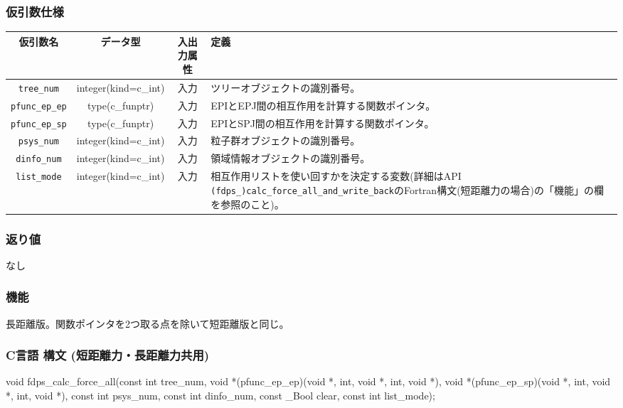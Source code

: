 \subsubsection*{仮引数仕様}
\begin{table}[h]
\begin{tabularx}{\linewidth}{cccX}
\toprule
\rowcolor{Snow2}
仮引数名 & データ型 & 入出力属性 & 定義 \\
\midrule
\verb|tree_num|    & integer(kind=c\_int)   & 入力     & ツリーオブジェクトの識別番号。\\
\verb|pfunc_ep_ep| & type(c\_funptr)        & 入力     & EPIとEPJ間の相互作用を計算する関数ポインタ。\\
\verb|pfunc_ep_sp| & type(c\_funptr)        & 入力     & EPIとSPJ間の相互作用を計算する関数ポインタ。\\
\verb|psys_num|    & integer(kind=c\_int)   & 入力     & 粒子群オブジェクトの識別番号。\\
\verb|dinfo_num|   & integer(kind=c\_int)   & 入力     & 領域情報オブジェクトの識別番号。\\
\verb|list_mode|   & integer(kind=c\_int)   & 入力     & 相互作用リストを使い回すかを決定する変数(詳細はAPI \texttt{(fdps\_)calc\_force\_all\_and\_write\_back}のFortran構文(短距離力の場合)の「機能」の欄を参照のこと)。\\
\bottomrule
\end{tabularx}
\end{table}

\subsubsection*{返り値}
なし

\subsubsection*{機能}
長距離版。関数ポインタを2つ取る点を除いて短距離版と同じ。
\clearpage

\subsubsection*{C言語 構文 (短距離力・長距離力共用)}
\begin{screen}
\begin{spverbatim}
void fdps_calc_force_all(const int tree_num,
                         void *(pfunc_ep_ep)(void *, int, void *, int, void *),
                         void *(pfunc_ep_sp)(void *, int, void *, int, void *),
                         const int psys_num,
                         const int dinfo_num,
                         const _Bool clear,
                         const int list_mode);
\end{spverbatim}
\end{screen}

